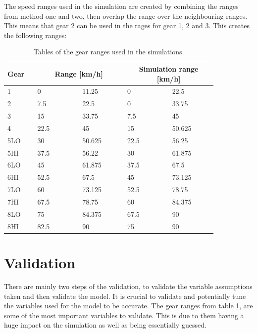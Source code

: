 \documentclass[noprint]{uit-thesis}
\begin{document}

The speed ranges used in the simulation are created by combining the ranges from method one and two, then overlap the range over the neighbouring ranges. This means that gear 2 can be used in the rages for gear 1, 2 and 3. This creates the following ranges:

\begin{table}[H]
\center
\begin{tabular}{| p{0.12\linewidth} | p{0.18\linewidth} | p{0.18\linewidth} | p{0.18\linewidth} | p{0.18\linewidth} |} 

 \hline
 \textbf{Gear} & \multicolumn{2}{|c|}{\textbf{Range [km/h]}} & \multicolumn{2}{|c|}{\textbf{Simulation range [km/h]}} \\
 \hline 
1 & 0 	& 11.25 	& 0 		& 22.5 \\
2 & 7.5 	& 22.5 	& 0 		& 33.75 \\
3 & 15 	& 33.75	& 7.5		& 45 \\
4 & 22.5	& 45		& 15		& 50.625 \\
5LO & 30 	& 50.625	& 22.5	& 56.25 \\
5HI & 37.5 & 56.22	& 30		& 61.875 \\
6LO & 45 	& 61.875	& 37.5	& 67.5 \\
6HI & 52.5 & 67.5	& 45		& 73.125 \\
7LO & 60 	& 73.125	& 52.5	& 78.75 \\
7HI & 67.5 & 78.75	& 60		& 84.375 \\
8LO & 75 	& 84.375	& 67.5	& 90 \\
8HI & 82.5 & 90		& 75		& 90 \\
 \hline
\end{tabular}
\caption{Tables of the gear ranges used in the simulations.}
\label{tab:gears}
\end{table}



\section {Validation}
\label {validation}
There are mainly two steps of the validation, to validate the variable assumptions taken and then validate the model. It is crucial to validate and potentially tune the variables used for the model to be accurate. The gear ranges from table \ref{tab:gears}, are some of the most important variables to validate. This is due to them having a huge impact on the simulation as well as being essentially guessed. 
\end{document}
